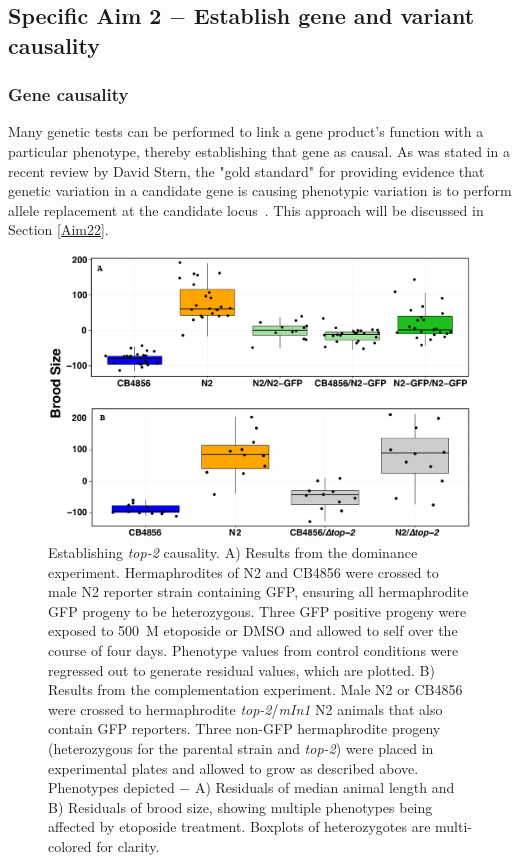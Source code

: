 \documentclass[12pt]{article}
\begin{document}
\subsection{Specific Aim 2 $-$ Establish gene and variant causality}\label{Aim2}

\subsubsection{Gene causality}\label{Aim21}

Many genetic tests can be performed to link a gene product's function with a particular phenotype, thereby establishing that gene as causal. As was stated in a recent review by David Stern, the "gold standard" for providing evidence that genetic variation in a candidate gene is causing phenotypic variation is to perform allele replacement at the candidate locus~\cite{Stern:2014jp}. This approach will be discussed in Section \ref{Aim22}. 

\vspace{5pt}

\begin{figure}[h]
\captionsetup{font=tiny}
\centering
\includegraphics[scale=0.25]{Figures/Figure3.pdf}
\caption[Establishing {\it top-2} causality]{Establishing {\it top-2} causality. A) Results from the dominance experiment. Hermaphrodites of N2 and CB4856 were crossed to male N2 reporter strain containing GFP, ensuring all hermaphrodite GFP progeny to be heterozygous. Three GFP positive progeny were exposed to 500~\textmu M etoposide or DMSO and allowed to self over the course of four days. Phenotype values from control conditions were regressed out to generate residual values, which are plotted. B) Results from the complementation experiment. Male N2 or CB4856 were crossed to hermaphrodite {\it\textDelta top-2}/{\it mIn1} N2 animals that also contain GFP reporters. Three non-GFP hermaphrodite progeny (heterozygous for the parental strain and {\it\textDelta top-2}) were placed in experimental plates and allowed to grow as described above. Phenotypes depicted $-$ A) Residuals of median animal length and B) Residuals of brood size, showing multiple phenotypes being affected by etoposide treatment. Boxplots of heterozygotes are multi-colored for clarity. }
\label{DomComp}
\end{figure}
\end{document}
